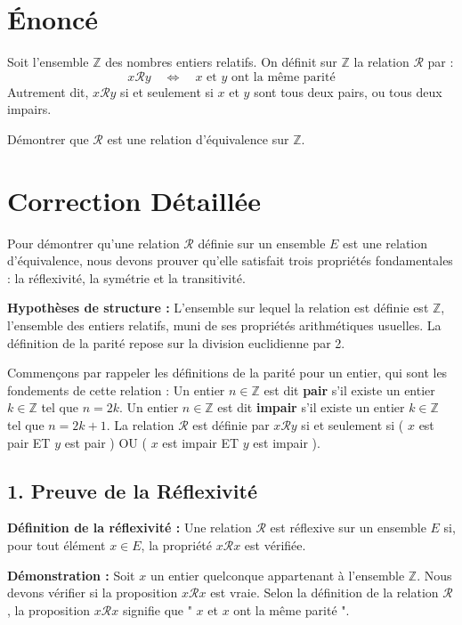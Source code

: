 \documentclass{report}
\begin{document}
\section*{Énoncé}
Soit l'ensemble $\mathbb{Z}$ des nombres entiers relatifs.
On définit sur $\mathbb{Z}$ la relation $\mathcal{R}$ par :
$$ x \mathcal{R} y \quad \iff \quad x \text{ et } y \text{ ont la même parité} $$
Autrement dit, $x \mathcal{R} y$ si et seulement si $x$ et $y$ sont tous deux pairs, ou tous deux impairs.

Démontrer que $\mathcal{R}$ est une relation d'équivalence sur $\mathbb{Z}$.

\section*{Correction Détaillée}
Pour démontrer qu'une relation $\mathcal{R}$ définie sur un ensemble $E$ est une relation d'équivalence, nous devons prouver qu'elle satisfait trois propriétés fondamentales : la réflexivité, la symétrie et la transitivité.

\textbf{Hypothèses de structure :} L'ensemble sur lequel la relation est définie est $\mathbb{Z}$, l'ensemble des entiers relatifs, muni de ses propriétés arithmétiques usuelles. La définition de la parité repose sur la division euclidienne par 2.

Commençons par rappeler les définitions de la parité pour un entier, qui sont les fondements de cette relation :
Un entier $n \in \mathbb{Z}$ est dit \textbf{pair} s'il existe un entier $k \in \mathbb{Z}$ tel que $n = 2k$.
Un entier $n \in \mathbb{Z}$ est dit \textbf{impair} s'il existe un entier $k \in \mathbb{Z}$ tel que $n = 2k+1$.
La relation $\mathcal{R}$ est définie par $x \mathcal{R} y$ si et seulement si ( $x$ est pair ET $y$ est pair ) OU ( $x$ est impair ET $y$ est impair ).

\subsection*{1. Preuve de la Réflexivité}

\textbf{Définition de la réflexivité :} Une relation $\mathcal{R}$ est réflexive sur un ensemble $E$ si, pour tout élément $x \in E$, la propriété $x \mathcal{R} x$ est vérifiée.

\textbf{Démonstration :}
Soit $x$ un entier quelconque appartenant à l'ensemble $\mathbb{Z}$.
Nous devons vérifier si la proposition $x \mathcal{R} x$ est vraie.
Selon la définition de la relation $\mathcal{R}$, la proposition $x \mathcal{R} x$ signifie que " $x$ et $x$ ont la même parité ".
\end{document}
